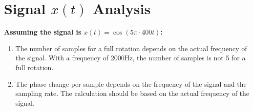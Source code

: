 \documentclass{article}
\begin{document}
\section*{Signal \( x(t) \) Analysis}

\textbf{Assuming the signal is \( x(t) = \cos(5 \pi \cdot 400t) \):}

\begin{enumerate}
    \item The number of samples for a full rotation depends on the actual frequency of the signal. With a frequency of 2000Hz, the number of samples is not 5 for a full rotation.
    \item The phase change per sample depends on the frequency of the signal and the sampling rate. The calculation should be based on the actual frequency of the signal.
\end{enumerate}
\end{document}
